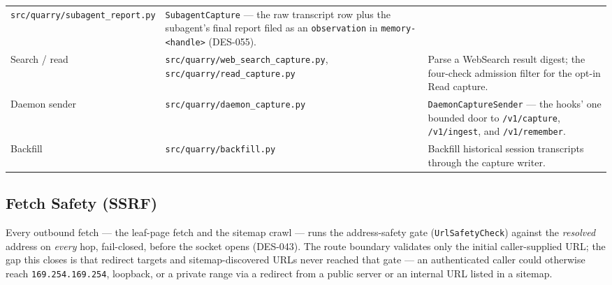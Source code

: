 \documentclass[a4paper,10pt]{article}
\newcommand{\modpath}[1]{\texttt{src/quarry/#1}}
\begin{document}
\begin{center}
\begin{tabular}{llp{7cm}}
                 \modpath{subagent\_report.py} & \texttt{SubagentCapture}
                 --- the raw transcript row plus the subagent's final
                 report filed as an \texttt{observation} in
                 \texttt{memory-<handle>} (DES-055). \\
Search / read  & \modpath{web\_search\_capture.py},
                 \modpath{read\_capture.py} & Parse a WebSearch result
                 digest; the four-check admission filter for the opt-in
                 Read capture. \\
Daemon sender  & \modpath{daemon\_capture.py} & \texttt{DaemonCaptureSender}
                 --- the hooks' one bounded door to \texttt{/v1/capture},
                 \texttt{/v1/ingest}, and \texttt{/v1/remember}. \\
Backfill       & \modpath{backfill.py}      & Backfill historical
                 session transcripts through the capture writer. \\
\bottomrule
\end{tabular}
\end{center}

\subsection{Fetch Safety (SSRF)}

Every outbound fetch --- the leaf-page fetch and the sitemap crawl ---
runs the address-safety gate (\texttt{UrlSafetyCheck}) against the
\emph{resolved} address on \emph{every} hop, fail-closed, before the
socket opens (DES-043).  The route boundary validates only the initial
caller-supplied URL; the gap this closes is that redirect targets and
sitemap-discovered URLs never reached that gate --- an authenticated
caller could otherwise reach \texttt{169.254.169.254}, loopback, or a
private range via a redirect from a public server or an internal URL
listed in a sitemap.
\end{document}
